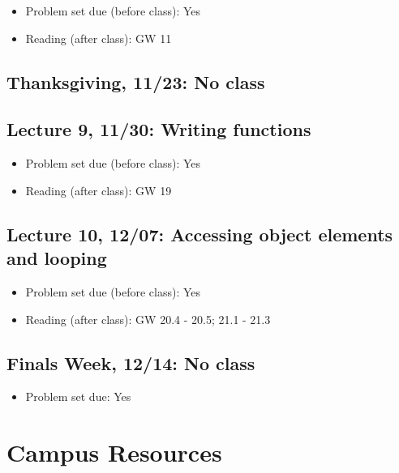 \documentclass[11pt,]{article}
\providecommand{\tightlist}{%
  \setlength{\itemsep}{0pt}\setlength{\parskip}{0pt}}
\begin{document}
\begin{itemize}
\tightlist
\item
  Problem set due (before class): Yes
\item
  Reading (after class): GW 11
\end{itemize}

\subsection{Thanksgiving, 11/23: No
class}\label{thanksgiving-1123-no-class}

\subsection{Lecture 9, 11/30: Writing
functions}\label{lecture-9-1130-writing-functions}

\begin{itemize}
\tightlist
\item
  Problem set due (before class): Yes
\item
  Reading (after class): GW 19
\end{itemize}

\subsection{Lecture 10, 12/07: Accessing object elements and
looping}\label{lecture-10-1207-accessing-object-elements-and-looping}

\begin{itemize}
\tightlist
\item
  Problem set due (before class): Yes
\item
  Reading (after class): GW 20.4 - 20.5; 21.1 - 21.3
\end{itemize}

\subsection{Finals Week, 12/14: No
class}\label{finals-week-1214-no-class}

\begin{itemize}
\tightlist
\item
  Problem set due: Yes
\end{itemize}

\section{Campus Resources}\label{campus-resources}
\end{document}
